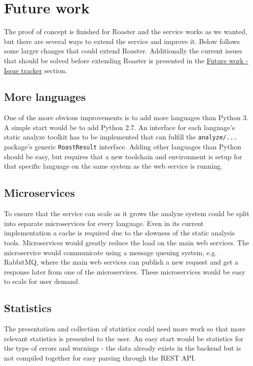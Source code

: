 \documentclass[12pt,a4paper]{report}
\begin{document}
\chapter{Future work}
\label{sec:future-work}
The proof of concept is finished for Roaster and the service works as we wanted, but there are several ways to extend the service and improve it. Below follows some larger changes that could extend Roaster. Additionally the current issues that should be solved before extending Roaster is presented in the \hyperref[sec:issue-tracker]{Future work - Issue tracker} section.

\section{More languages}
One of the more obvious improvements is to add more languages than Python 3. A simple start would be to add Python 2.7. An interface for each language's static analyze toolkit has to be implemented that can fulfill the \texttt{analyze/...} package's generic \texttt{RoastResult} interface. Adding other languages than Python should be easy, but requires that a new toolchain and environment is setup for that specific language on the same system as the web service is running.

\section{Microservices}
To ensure that the service can scale as it grows the analyze system could be split into separate microservices for every language. Even in its current implementation a cache is required due to the slowness of the static analysis tools. Microservices would greatly reduce the load on the main web services. The microservice would communicate using a message queuing system, e.g. RabbitMQ, where the main web services can publish a new request and get a response later from one of the microservices. These microservices would be easy to scale for user demand.

\section{Statistics}
The presentation and collection of statistics could need more work so that more relevant statistics is presented to the user. An easy start would be statistics for the type of errors and warnings - the data already exists in the backend but is not compiled together for easy parsing through the REST API.
\end{document}

